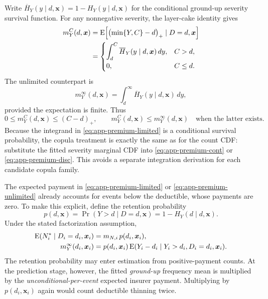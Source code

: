 \documentclass[11pt]{article}
\begin{document}
{Write
$\overline H_Y(y\mid d,\boldsymbol{x})
   =1-H_Y(y\mid d,\boldsymbol{x})$
for the conditional ground-up severity survival function. For any
nonnegative severity, the layer-cake identity gives
\begin{align}
 m_Y^{C}(d,\boldsymbol{x})
 &=\operatorname{E}\!\left[
       \bigl(\min\{Y,C\}-d\bigr)_{+}\mid D=d,\boldsymbol{x}
   \right]\notag\\
 &=\begin{cases}
   \displaystyle\int_d^C\overline H_Y(y\mid d,\boldsymbol{x})\,dy,
      & C>d,\\[6pt]
   0,&C\le d.
   \end{cases}
 \label{eq:app-premium-limited}
\end{align}
The unlimited counterpart is
\begin{equation}
 m_Y^{\infty}(d,\boldsymbol{x})
   =\int_d^{\infty}\overline H_Y(y\mid d,\boldsymbol{x})\,dy,
 \label{eq:app-premium-unlimited}
\end{equation}
provided the expectation is finite. Thus
\begin{equation}
 0\le m_Y^{C}(d,\boldsymbol{x})\le(C-d)_{+},\qquad
 m_Y^{C}(d,\boldsymbol{x})\le m_Y^{\infty}(d,\boldsymbol{x})
 \quad\text{when the latter exists}.
 \label{eq:app-premium-bounds}
\end{equation}
Because the integrand in \eqref{eq:app-premium-limited} is a conditional
survival probability, the copula treatment is exactly the same as for the
count CDF: substitute the fitted severity marginal CDF into
\eqref{eq:app-premium-cont} or \eqref{eq:app-premium-disc}. This avoids
a separate integration derivation for each candidate copula family.

The expected payment in \eqref{eq:app-premium-limited} or
\eqref{eq:app-premium-unlimited} already accounts for events below the
deductible, whose payments are zero. To make this explicit, define the
retention probability
\begin{equation}
 p(d,\boldsymbol{x})
  =\Pr(Y>d\mid D=d,\boldsymbol{x})
  =1-H_Y(d\mid d,\boldsymbol{x}).
 \label{eq:app-premium-retention}
\end{equation}
Under the stated factorization assumption,
\begin{align}
 \operatorname{E}(N_i^*\mid D_i=d_i,\boldsymbol{x}_i)
 &=m_{N,i}\,p(d_i,\boldsymbol{x}_i),\notag\\
 m_Y^{\infty}(d_i,\boldsymbol{x}_i)
 &=p(d_i,\boldsymbol{x}_i)
   \operatorname{E}(Y_i-d_i\mid Y_i>d_i,D_i=d_i,\boldsymbol{x}_i).
 \label{eq:app-premium-thinning}
\end{align}
The retention probability may enter estimation from positive-payment
counts. At the prediction stage, however, the fitted \emph{ground-up}
frequency mean is multiplied by the \emph{unconditional-per-event}
expected insurer payment. Multiplying by $p(d_i,\boldsymbol{x}_i)$ again
would count deductible thinning twice.

}
\end{document}
